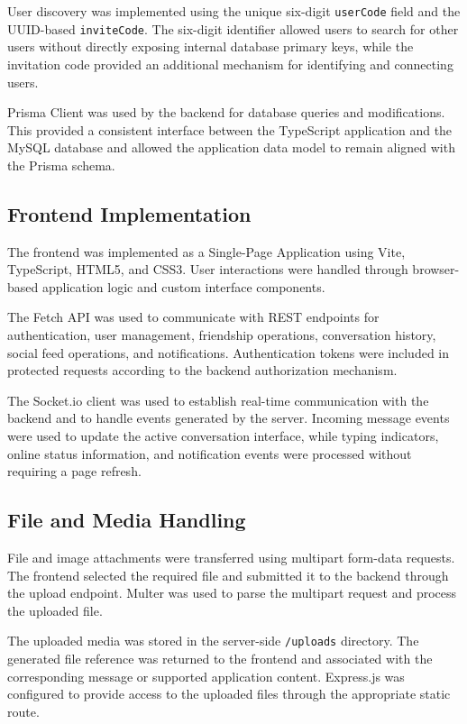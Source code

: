 \documentclass[12pt, a4paper]{article}
\begin{document}
User discovery was implemented using the unique six-digit \texttt{userCode} field and the UUID-based \texttt{inviteCode}. The six-digit identifier allowed users to search for other users without directly exposing internal database primary keys, while the invitation code provided an additional mechanism for identifying and connecting users.

Prisma Client was used by the backend for database queries and modifications. This provided a consistent interface between the TypeScript application and the MySQL database and allowed the application data model to remain aligned with the Prisma schema.


\subsection{Frontend Implementation}

The frontend was implemented as a Single-Page Application using Vite, TypeScript, HTML5, and CSS3. User interactions were handled through browser-based application logic and custom interface components.

The Fetch API was used to communicate with REST endpoints for authentication, user management, friendship operations, conversation history, social feed operations, and notifications. Authentication tokens were included in protected requests according to the backend authorization mechanism.

The Socket.io client was used to establish real-time communication with the backend and to handle events generated by the server. Incoming message events were used to update the active conversation interface, while typing indicators, online status information, and notification events were processed without requiring a page refresh.


\subsection{File and Media Handling}

File and image attachments were transferred using multipart form-data requests. The frontend selected the required file and submitted it to the backend through the upload endpoint. Multer was used to parse the multipart request and process the uploaded file.

The uploaded media was stored in the server-side \texttt{/uploads} directory. The generated file reference was returned to the frontend and associated with the corresponding message or supported application content. Express.js was configured to provide access to the uploaded files through the appropriate static route.
\end{document}
